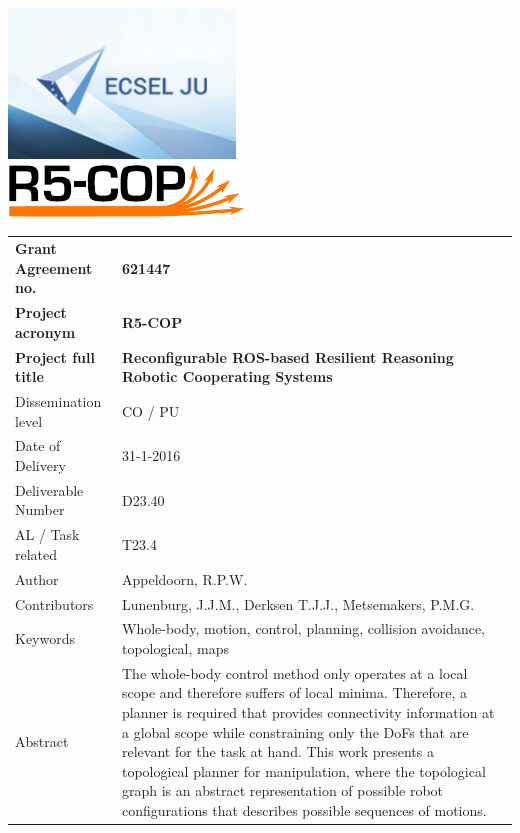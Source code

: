 \thispagestyle{empty}
{\noindent\centering\includegraphics[height=4cm]{pics/ecsel-logo}~~~~~~\\[3cm]}
{\noindent\centering\includegraphics{pics/r5-cop}\\[1cm]}

\begin{tabular}{|p{4.5cm}p{11cm}|}
\hline
\rowcolor[gray]{0.8}
\bf Grant Agreement no.
	& \bf 621447\\
\rowcolor[gray]{0.8}
\bf Project acronym
	& \bf R5-COP\\
\rowcolor[gray]{0.8}
\bf	Project full title
	& \bf Reconfigurable ROS-based Resilient Reasoning Robotic Cooperating Systems\\
\hline

Dissemination level
	& CO / PU\\
Date of Delivery
	& 31-1-2016\\
Deliverable Number
	& D23.40 \\
AL / Task related
	& T23.4\\
Author
	& Appeldoorn, R.P.W. \\
Contributors
	& Lunenburg, J.J.M., Derksen T.J.J., Metsemakers, P.M.G.\\
Keywords
	& Whole-body, motion, control, planning, collision avoidance, topological, maps\\
Abstract &
	The whole-body control method only operates at a local scope and therefore suffers of local minima. Therefore, a planner is required that provides connectivity information at a global scope while constraining only the DoFs that are relevant for the task at hand. This work presents a topological planner for manipulation, where the topological graph is an abstract representation of possible robot configurations that describes possible sequences of motions. \\
\hline
\end{tabular}
\vfill\eject
